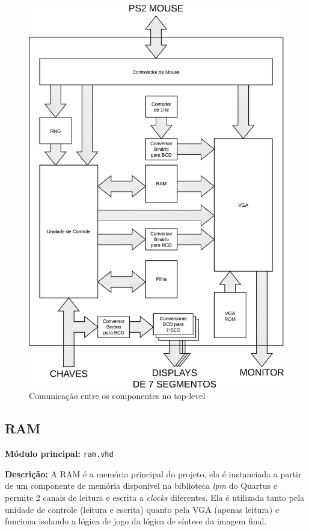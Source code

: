 \documentclass[12pt]{article}
\begin{document}
\begin{figure}[ht!]
	\centering
	\includegraphics[scale=0.85]{img/overview.png}
	\vspace{3mm}
	\caption{Comunicação entre os componentes no top-level}
	\label{fig:overview}
\end{figure}


\subsection{RAM}
\label{sec:ram}

{\bf Módulo principal:} \verb|ram.vhd|

{\bf Descrição:} A RAM é a memória principal do projeto, ela é instanciada a 
partir de um componente de memória disponível na biblioteca \emph{lpm} do 
Quartus e permite 2 canais de leitura e escrita a \emph{clocks} diferentes. 
Ela é utilizada tanto pela unidade de controle (leitura e escrita) quanto pela
VGA (apenas leitura) e funciona isolando a lógica de jogo da lógica de síntese
da imagem final.
\end{document}
